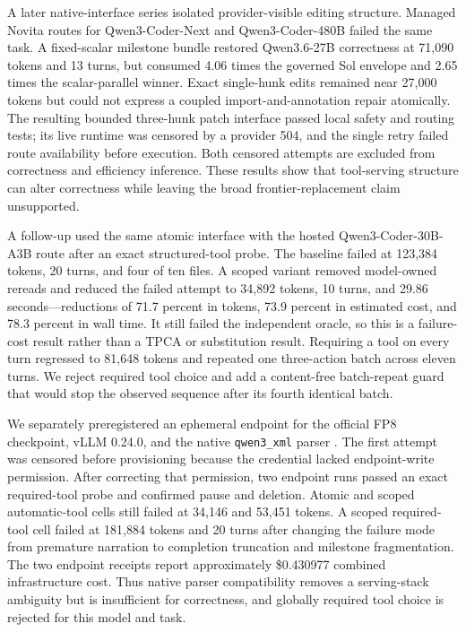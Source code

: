 \documentclass[10pt,twocolumn]{article}
\begin{document}
A later native-interface series isolated provider-visible editing structure.
Managed Novita routes for Qwen3-Coder-Next and Qwen3-Coder-480B failed the same
task. A fixed-scalar milestone bundle restored Qwen3.6-27B correctness at 71,090
tokens and 13 turns, but consumed 4.06 times the governed Sol envelope and 2.65
times the scalar-parallel winner. Exact single-hunk edits remained near 27,000
tokens but could not express a coupled import-and-annotation repair atomically.
The resulting bounded three-hunk patch interface passed local safety and routing
tests; its live runtime was censored by a provider 504, and the single retry
failed route availability before execution. Both censored attempts are excluded
from correctness and efficiency inference. These results show that tool-serving
structure can alter correctness while leaving the broad frontier-replacement
claim unsupported.

A follow-up used the same atomic interface with the hosted
Qwen3-Coder-30B-A3B route after an exact structured-tool probe. The baseline
failed at 123,384 tokens, 20 turns, and four of ten files. A scoped variant
removed model-owned rereads and reduced the failed attempt to 34,892 tokens,
10 turns, and 29.86 seconds---reductions of 71.7 percent in tokens, 73.9
percent in estimated cost, and 78.3 percent in wall time. It still failed the
independent oracle, so this is a failure-cost result rather than a TPCA or
substitution result. Requiring a tool on every turn regressed to 81,648 tokens
and repeated one three-action batch across eleven turns. We reject required
tool choice and add a content-free batch-repeat guard that would stop the
observed sequence after its fourth identical batch.

We separately preregistered an ephemeral endpoint for the official FP8
checkpoint, vLLM 0.24.0, and the native \texttt{qwen3\_xml} parser
\citep{qwen3coder30b,vllmtoolcalling,hfendpoints}. The first attempt was
censored before provisioning because the credential lacked endpoint-write
permission. After correcting that permission, two endpoint runs passed an exact
required-tool probe and confirmed pause and deletion. Atomic and scoped
automatic-tool cells still failed at 34,146 and 53,451 tokens. A scoped
required-tool cell failed at 181,884 tokens and 20 turns after changing the
failure mode from premature narration to completion truncation and milestone
fragmentation. The two endpoint receipts report approximately \$0.430977
combined infrastructure cost. Thus native parser compatibility removes a
serving-stack ambiguity but is insufficient for correctness, and globally
required tool choice is rejected for this model and task.
\end{document}
